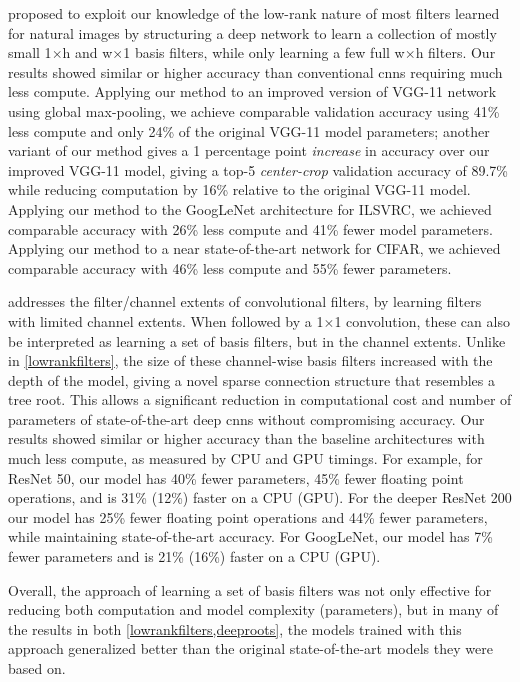 \documentclass[thesis]{subfiles}
\begin{document}
 proposed to exploit our knowledge of the low-rank nature of most filters learned for natural images by structuring a deep network to learn a collection of mostly small 1$\times$h and w$\times$1 basis filters, while only learning a few full w$\times$h filters. Our results showed similar or higher accuracy than conventional \glspl{cnn} requiring much less compute. Applying our method to an improved version of VGG-11 network using global max-pooling, we achieve comparable validation accuracy using 41\% less compute and only 24\% of the original VGG-11 model parameters; another variant of our method gives a 1 percentage point {\em increase} in accuracy over our improved VGG-11 model, giving a top-5 \emph{center-crop} validation accuracy of 89.7\% while reducing computation by 16\% relative to the original VGG-11 model. Applying our method to the GoogLeNet architecture for ILSVRC, we achieved comparable accuracy with 26\% less compute and 41\% fewer model parameters. Applying our method to a near state-of-the-art network for CIFAR, we achieved comparable accuracy with 46\% less compute and 55\% fewer parameters. 
	
 addresses the filter/channel extents of convolutional filters, by learning filters with limited channel extents. When followed by a 1$\times$1 convolution, these can also be interpreted as learning a set of basis filters, but in the channel extents. 
Unlike in \cref{lowrankfilters}, the size of these channel-wise basis filters increased with the depth of the model, giving a novel sparse connection structure that resembles a tree root. This allows a significant reduction in computational cost and number of parameters of state-of-the-art deep \glspl{cnn} without compromising accuracy. Our results showed similar or higher accuracy than the baseline architectures with much less compute, as measured by CPU and GPU timings. For example, for ResNet 50, our model has 40\% fewer parameters, 45\% fewer floating point operations, and is 31\% (12\%) faster on a CPU (GPU). For the deeper ResNet 200 our model has 25\% fewer floating point operations and 44\% fewer parameters, while maintaining state-of-the-art accuracy. For GoogLeNet, our model has 7\% fewer parameters and is 21\% (16\%) faster on a CPU (GPU).

Overall, the approach of learning a set of basis filters was not only effective for reducing both computation and model complexity (parameters), but in many of the results in both \cref{lowrankfilters,deeproots}, the models trained with this approach generalized better than the original state-of-the-art models they were based on.
\end{document}
